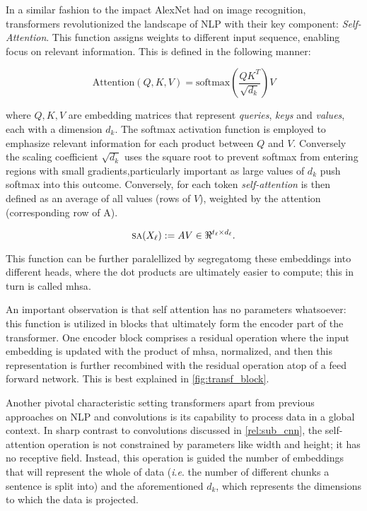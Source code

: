 In a similar fashion to the impact AlexNet had on image recognition, transformers revolutionized 
the landscape of NLP with their key component: \emph{Self-Attention}. This function assigns 
weights to different input sequence, enabling focus on relevant information. 
This is defined in the following manner:

\begin{equation}
    \mbox{Attention}(Q, K, V) = \mbox{softmax}\left(\frac{QK^T}{\sqrt{d_k}}\right) V
    \label{eq:att}
\end{equation}

\noindent where $Q, K, V$ are embedding matrices that represent \emph{queries}, \emph{keys} and 
\emph{values}, each with a dimension $d_k$. The softmax activation function is employed to 
emphasize relevant information for each product between $Q$ and $V$. Conversely the scaling 
coefficient $\sqrt{d_k}$ uses the square root to prevent softmax from entering regions with small 
gradients,particularly important as large values of $d_k$ push softmax into this outcome. 
Conversely, for each token \emph{self-attention} is then defined as an average of all values 
(rows of $V$), weighted by the attention (corresponding row of A).

\begin{equation}
	\sa(X_\ell) \defn A V \in \real^{t_\ell \times d_\ell}.
\label{eq:SA}
\end{equation}

This function can be further paralellized by segregatomg these embeddings into different 
heads, where the dot products are ultimately easier to compute; this in turn is called \gls{mhsa}.

An important observation is that self attention has no parameters whatsoever: this function is 
utilized in blocks that ultimately form the encoder part of the transformer. One encoder block 
comprises a residual operation where the input embedding is updated with the product of \gls{mhsa}, 
normalized, and then this representation is further recombined with the residual operation atop of 
a feed forward network. This is best explained in \autoref{fig:transf_block}.



Another pivotal characteristic setting transformers apart from previous approaches on NLP 
and convolutions is its capability to process data in a global context. In sharp contrast to 
convolutions discussed in \autoref{rel:sub_cnn}, the self-attention operation is not constrained by 
parameters like width and height; it has no receptive field. Instead, this operation is guided 
the number of embeddings that will represent the whole of data (\textit{i}.\textit{e}. the number 
of different chunks a sentence is split into) and the aforementioned $d_k$, which represents the 
dimensions to which the data is projected. 

